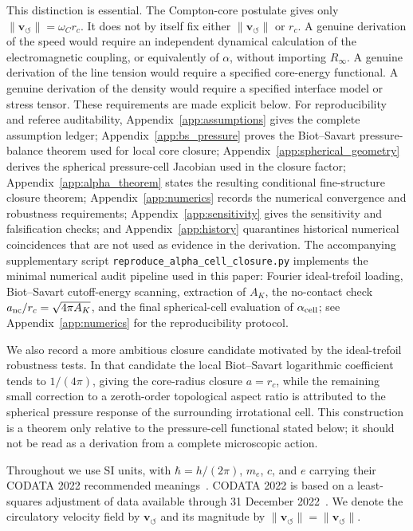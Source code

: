 \documentclass[aps,pra,preprint,longbibliography,nofootinbib]{revtex4-2}
\newcommand{\vnorm}{\lVert\mathbf{v}_{\!\boldsymbol{\circlearrowleft}}\rVert} %
\begin{document}
This distinction is essential.  The Compton-core postulate gives only
$\lVert \mathbf{v}_{\!\boldsymbol{\circlearrowleft}}\rVert=\omega_C r_c$.
It does not by itself fix either
$\lVert \mathbf{v}_{\!\boldsymbol{\circlearrowleft}}\rVert$ or $r_c$.
A genuine derivation of the speed would require an independent dynamical
calculation of the electromagnetic coupling, or equivalently of
$\alpha$, without importing $R_\infty$.  A genuine derivation of the line
tension would require a specified core-energy functional.  A genuine
derivation of the density would require a specified interface model or
stress tensor.  These requirements are made explicit below.  For reproducibility and
referee auditability, Appendix~\ref{app:assumptions} gives the complete
assumption ledger; Appendix~\ref{app:bs_pressure} proves the Biot--Savart
pressure-balance theorem used for local core closure;
Appendix~\ref{app:spherical_geometry} derives the spherical pressure-cell
Jacobian used in the closure factor; Appendix~\ref{app:alpha_theorem}
states the resulting conditional fine-structure closure theorem;
Appendix~\ref{app:numerics} records the numerical convergence and
robustness requirements; Appendix~\ref{app:sensitivity} gives the
sensitivity and falsification checks; and Appendix~\ref{app:history}
quarantines historical numerical coincidences that are not used as
evidence in the derivation.  The accompanying supplementary script
\texttt{reproduce\_alpha\_cell\_closure.py} implements the minimal numerical
audit pipeline used in this paper: Fourier ideal-trefoil loading,
Biot--Savart cutoff-energy scanning, extraction of $A_K$, the
no-contact check $a_{\rm nc}/r_c=\sqrt{4\pi A_K}$, and the final
spherical-cell evaluation of $\alpha_{\rm cell}$; see
Appendix~\ref{app:numerics} for the reproducibility protocol.


We also record a more ambitious closure candidate motivated by the
ideal-trefoil robustness tests.  In that candidate the local
Biot--Savart logarithmic coefficient tends to $1/(4\pi)$, giving the
core-radius closure $a=r_c$, while the remaining small correction to a
zeroth-order topological aspect ratio is attributed to the spherical
pressure response of the surrounding irrotational cell.  This construction
is a theorem only relative to the pressure-cell functional stated below;
it should not be read as a derivation from a complete microscopic action.

Throughout we use SI units, with $\hbar=h/(2\pi)$, $m_e$, $c$, and $e$
carrying their CODATA 2022 recommended meanings~\cite{MohrTaylor2022}.
CODATA 2022 is based on a least-squares adjustment of data available
through 31 December 2022~\cite{MohrTaylor2022}.  We denote the
circulatory velocity field by $\mathbf{v}_{\!\boldsymbol{\circlearrowleft}}$
and its magnitude by
$\vnorm=\lVert \mathbf{v}_{\!\boldsymbol{\circlearrowleft}}\rVert$.
\end{document}
